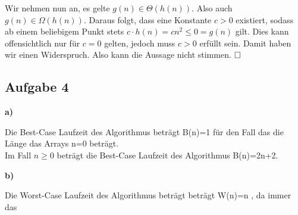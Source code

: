 \documentclass[a4paper,graphics,11pt]{article}
\newcommand{\aufgabe}[1]{\subsection*{Aufgabe #1}}
\begin{document}
Wir nehmen nun an, es gelte $g(n) \in \Theta(h(n))$. Also auch $g(n) \in \Omega(h(n))$. Daraus folgt, dass eine Konstante
$c > 0$ existiert, sodass ab einem beliebigem Punkt stets $c \cdot h(n) = cn^2 \leq 0 = g(n)$ gilt. Dies kann offensichtlich
nur für $c = 0$ gelten, jedoch muss $c > 0$ erfüllt sein. Damit haben wir einen Widerspruch. Also kann die Aussage nicht stimmen.
$\hfill\square$

\newpage
\aufgabe{4}
\textbf{a)}

Die Best-Case Laufzeit des Algorithmus beträgt B(n)=1 für den Fall das die Länge das Arrays n=0 beträgt.\\
Im Fall $n\geq0$ beträgt die Best-Case Laufzeit des Algorithmus B(n)=2n+2.

\textbf{b)}

Die Worst-Case Laufzeit des Algorithmus beträgt beträgt W(n)=n , da immer das
\end{document}
